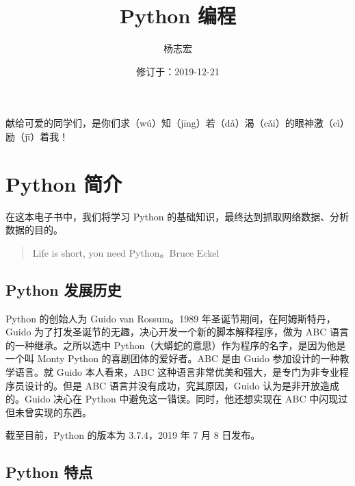 \documentclass[]{ctexbook}
\title{Python 编程}
\author{杨志宏}
\date{修订于：2019-12-21}
\begin{document}
\maketitle


\thispagestyle{empty}

\begin{center}
献给可爱的同学们，是你们求（wú）知（jīng）若（dǎ）渴（cǎi）的眼神激（cì）励（jī）着我！
\end{center}

\setlength{\abovedisplayskip}{-5pt}
\setlength{\abovedisplayshortskip}{-5pt}

{
\setcounter{tocdepth}{2}
\tableofcontents
}
\listoftables
\listoffigures
\hypertarget{python-ux7b80ux4ecb}{%
\chapter*{Python 简介}\label{python-ux7b80ux4ecb}}


在这本电子书中，我们将学习 Python 的基础知识，最终达到抓取网络数据、分析数据的目的。

\begin{quote}
Life is short, you need Python。Bruce Eckel
\end{quote}

\hypertarget{python-ux53d1ux5c55ux5386ux53f2}{%
\section{Python 发展历史}\label{python-ux53d1ux5c55ux5386ux53f2}}

Python 的创始人为 Guido van Rossum。1989 年圣诞节期间，在阿姆斯特丹，Guido 为了打发圣诞节的无趣，决心开发一个新的脚本解释程序，做为 ABC 语言的一种继承。之所以选中 Python（大蟒蛇的意思）作为程序的名字，是因为他是一个叫 Monty Python 的喜剧团体的爱好者。ABC 是由 Guido 参加设计的一种教学语言。就 Guido 本人看来，ABC 这种语言非常优美和强大，是专门为非专业程序员设计的。但是 ABC 语言并没有成功，究其原因，Guido 认为是非开放造成的。Guido 决心在 Python 中避免这一错误。同时，他还想实现在 ABC 中闪现过但未曾实现的东西。

截至目前，Python 的版本为 3.7.4，2019 年 7 月 8 日发布。

\hypertarget{python-ux7279ux70b9}{%
\section{Python 特点}\label{python-ux7279ux70b9}}
\end{document}
